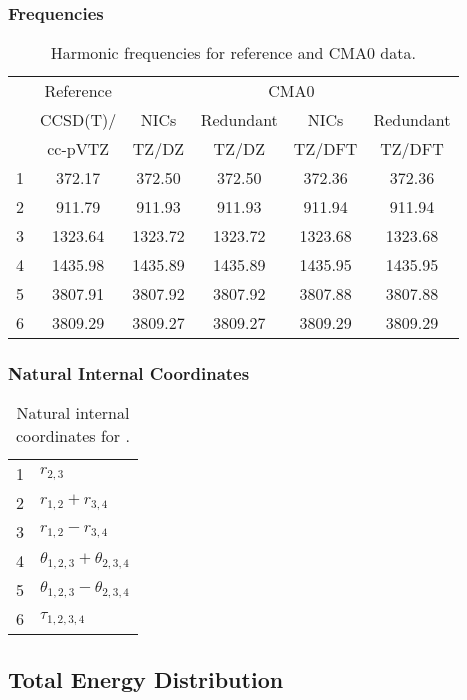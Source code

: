 \documentclass[10pt,oneside]{article}
\begin{document}
\begin{table}[h!]
\subsubsection*{Frequencies}
\centering
\caption{Harmonic frequencies for reference and CMA0 data.}
\begin{tabular}{cccccc}
\toprule
{} & Reference & \multicolumn{4}{c}{CMA0} \\
{} &  CCSD(T)/ &    NICs &  Redundant &    NICs & Redundant \\
{} &   cc-pVTZ &   TZ/DZ &      TZ/DZ &  TZ/DFT &    TZ/DFT \\
\midrule
1 &    372.17 &  372.50 &     372.50 &  372.36 &    372.36 \\
2 &    911.79 &  911.93 &     911.93 &  911.94 &    911.94 \\
3 &   1323.64 & 1323.72 &    1323.72 & 1323.68 &   1323.68 \\
4 &   1435.98 & 1435.89 &    1435.89 & 1435.95 &   1435.95 \\
5 &   3807.91 & 3807.92 &    3807.92 & 3807.88 &   3807.88 \\
6 &   3809.29 & 3809.27 &    3809.27 & 3809.29 &   3809.29 \\
\bottomrule
\end{tabular}
\end{table}

\begin{table}[h!]
\subsubsection*{Natural Internal Coordinates}
\centering
\caption{Natural internal coordinates for .}
\small
\begin{tabular}{ll}
\toprule
  1   & $r_{2,3}$ \\
  2   & $r_{1,2} + r_{3,4}$ \\
  3   & $r_{1,2} - r_{3,4}$ \\
  4   & $\theta_{1,2,3} + \theta_{2,3,4}$ \\
  5   & $\theta_{1,2,3} - \theta_{2,3,4}$ \\
  6   & $\tau_{1,2,3,4}$ \\
\bottomrule
\end{tabular}
\end{table}

\begin{table}
\subsection*{Total Energy Distribution}
\centering\end{table}
\end{document}
